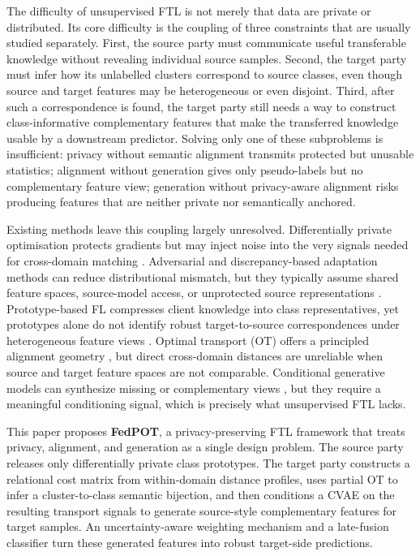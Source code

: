\documentclass[a4paper,fleqn]{cas-sc}
\begin{document}
The difficulty of unsupervised FTL is not merely that data are private or
distributed. Its core difficulty is the coupling of three constraints that
are usually studied separately. First, the source party must communicate
useful transferable knowledge without revealing individual source samples.
Second, the target party must infer how its unlabelled clusters correspond
to source classes, even though source and target features may be
heterogeneous or even disjoint. Third, after such a correspondence is found,
the target party still needs a way to construct class-informative
complementary features that make the transferred knowledge usable by a
downstream predictor. Solving only one of these subproblems is insufficient:
privacy without semantic alignment transmits protected but unusable
statistics; alignment without generation gives only pseudo-labels but no
complementary feature view; generation without privacy-aware alignment risks
producing features that are neither private nor semantically anchored.

Existing methods leave this coupling largely unresolved. Differentially
private optimisation protects gradients but may inject noise into the very
signals needed for cross-domain matching \citep{Abadi2016,McMahan2018DP}.
Adversarial and discrepancy-based adaptation methods can reduce
distributional mismatch, but they typically assume shared feature spaces,
source-model access, or unprotected source representations
\citep{Ganin2016,Long2018,Liang2020}. Prototype-based FL compresses
client knowledge into class representatives, yet prototypes alone do not
identify robust target-to-source correspondences under heterogeneous feature
views \citep{Tan2022Proto,YinCrossKTFRA}. Optimal transport (OT) offers a
principled alignment geometry \citep{Courty2017,Cuturi2013}, but direct
cross-domain distances are unreliable when source and target feature spaces
are not comparable. Conditional generative models can synthesize missing or
complementary views \citep{Kingma2014,Goodfellow2014,Mirza2014}, but they
require a meaningful conditioning signal, which is precisely what
unsupervised FTL lacks.

This paper proposes \textbf{FedPOT}, a privacy-preserving FTL framework that
treats privacy, alignment, and generation as a single design problem. The
source party releases only differentially private class prototypes. The
target party constructs a relational cost matrix from within-domain
distance profiles, uses partial OT to infer a cluster-to-class semantic
bijection, and then conditions a CVAE on the resulting transport signals to
generate source-style complementary features for target samples. An
uncertainty-aware weighting mechanism and a late-fusion classifier turn
these generated features into robust target-side predictions.
\end{document}
